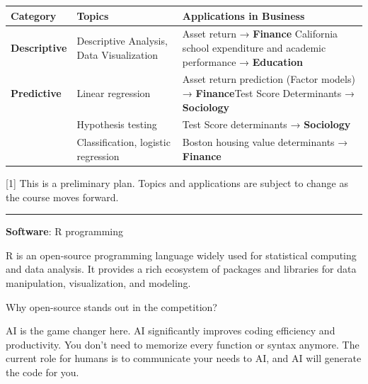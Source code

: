 \documentclass[
  12pt,
  letterpaper,
]{scrbook}
\theoremstyle{plain}
\theoremstyle{definition}
\theoremstyle{remark}
\begin{document}
\begin{longtable}[]{@{}
  >{\raggedright\arraybackslash}p{}
  >{\raggedright\arraybackslash}p{}
  >{\raggedright\arraybackslash}p{}@{}}
\toprule\noalign{}
\begin{minipage}[b]{\linewidth}\raggedright
\textbf{Category}
\end{minipage} & \begin{minipage}[b]{\linewidth}\raggedright
\textbf{Topics}
\end{minipage} & \begin{minipage}[b]{\linewidth}\raggedright
\textbf{Applications in Business}
\end{minipage} \\
\midrule\noalign{}
\endhead
\bottomrule\noalign{}
\endlastfoot
\textbf{Descriptive} & Descriptive Analysis, Data Visualization & Asset
return → \textbf{Finance} California school expenditure and academic
performance → \textbf{Education} \\
\textbf{Predictive} & Linear regression & Asset return prediction
(Factor models) → \textbf{Finance}Test Score Determinants →
\textbf{Sociology} \\
& Hypothesis testing & Test Score determinants → \textbf{Sociology} \\
& Classification, logistic regression & Boston housing value
determinants → \textbf{Finance} \\
\end{longtable}

{[}1{]} This is a preliminary plan. Topics and applications are subject
to change as the course moves forward.

\begin{center}\rule{0.5\linewidth}{0.5pt}\end{center}

\textbf{Software}: R programming

R is an open-source programming language widely used for statistical
computing and data analysis. It provides a rich ecosystem of packages
and libraries for data manipulation, visualization, and modeling.

Why open-source stands out in the competition?

AI is the game changer here. AI significantly improves coding efficiency
and productivity. You don't need to memorize every function or syntax
anymore. The current role for humans is to communicate your needs to AI,
and AI will generate the code for you.
\end{document}

